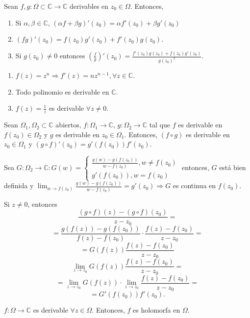 \begin{prop}
  Sean $f,g: \Omega \subset \mathbb{C} \to \mathbb{C}$ derivables en $z_{0} \in \Omega$. Entonces, 
  \begin{enumerate}[label=(\roman*)]
    \item Si $\alpha, \beta \in \mathbb{C}$, $(\alpha f + \beta g)'(z_{0}) = \alpha f'(z_{0}) + \beta g'(z_{0})$
    \item $(fg)'(z_{0}) = f(z_{0})g'(z_{0}) + f'(z_{0})g(z_{0})$.
    \item Si $ g(z_{0}) \neq 0$ entonces $(\frac{f}{g})'(z_{0}) = \frac{f'(z_{0})g(z_{0}) + f(z_{0})g'(z_{0})}{g(z_{0})^{2}}$.
  \end{enumerate}
\end{prop}

\begin{dem}

\end{dem}

\begin{ejm}
  \begin{enumerate}[label=(\roman*)]
    \item $f(z) = z^{n} \Rightarrow f'(z) = n z^{n-1}, \forall z \in \mathbb{C}$.
    \item Todo polinomio es derivable en $\mathbb{C}$.
    \item $f(z) = \frac{1}{z}$ es derivable $\forall z \neq 0$.
  \end{enumerate}
\end{ejm}

\begin{theo}
  Sean $\Omega_{1}, \Omega_{2} \subset \mathbb{C}$ abiertos, $ f: \Omega_{1} \to \mathbb{C}$, $g: \Omega_{2} \to \mathbb{C}$ tal que $f$ es derivable en $f(z_{0}) \in \Omega_{2}$ y $g$ es derivable en $z_{0} \in \Omega_{1}$. Entonces, $(f \circ g)$ es derivable en $z_{0} \in \Omega_{1}$ y $(g \circ f)'(z_{0}) = g'(f(z_{0}))f'(z_{0})$.
\end{theo}

\begin{dem}
  Sea $G: \Omega_{2} \to \mathbb{C} : G(w) =
  \begin{cases}
    \frac{g(w) - g(f(z_{0}))}{w - f(z_{0})}, w \neq f(z_{0}) \\
    g'(f(z_{0})), w=f(z_{0})
  \end{cases}$
  entonces, $G$ está bien definida y $ \lim_{w \to f(z_{0})} \frac{g(w) - g(f(z_{0}))}{w - f(z_{0})} = g'(z_{0}) \Rightarrow G$ es continua en $f(z_{0})$.

  Si $z \neq 0$, entonces
  \[
    \frac{(g \circ f)(z) - (g \circ f)(z_{0})}{z - z_{0}} = 
  \] 
  \[ = \frac{g(f(z)) - g(f(z_{0}))}{f(z) - f(z_{0})} \cdot \frac{f(z)-f(z_{0})}{z - z_{0}} =
  \] 
  \[
    = G(f(z)) \frac{f(z) - f(z_{0})}{z-z_{0}}
  \]
  \[ 
    \lim_{z \to z_{0}} G(f(z)) \frac{f(z) - f(z_{0})}{z-z_{0}} =
  \] 
  \[ 
    = \lim_{z \to z_{0}} G(f(z)) \cdot \lim_{z \to z_{0}} \frac{f(z) - f(z_{0})}{z -z_{0}} = 
  \]
  \[
    =G'(f(z_{0}))f'(z_{0}) .
  \] 
\end{dem}

\begin{obs}
  $f: \Omega \to \mathbb{C}$ es derivable $\forall z \in \Omega$. Entonces, $f$ es holomorfa en $\Omega$.
\end{obs}
